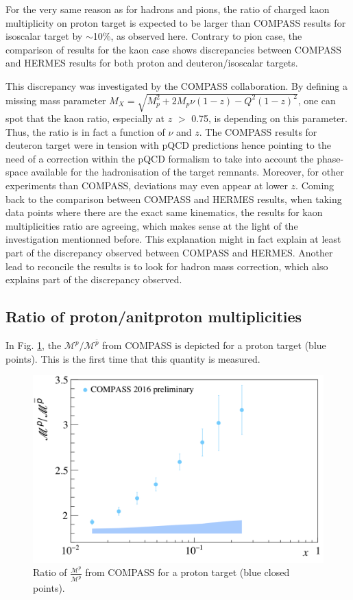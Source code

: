 For the very same reason as for hadrons and pions, the ratio of charged kaon multiplicity on proton target is expected to be larger than COMPASS results for isoscalar target by $\sim$10\%, as observed here. Contrary to pion case, the comparison of results for the kaon case shows discrepancies between COMPASS and HERMES results for both proton and deuteron/isoscalar targets.

This discrepancy was investigated by the COMPASS collaboration\cite{MarcinPubli}. By defining a missing mass parameter $M_X = \sqrt{M^2_p + 2M_p \nu (1-z) - Q^2 (1-z)^2}$, one can spot that the kaon ratio, especially at $z$ $>$ 0.75, is depending on this parameter. Thus, the ratio is in fact a function of $\nu$ and $z$. The COMPASS results for deuteron target were in tension with pQCD predictions hence pointing to the need of a correction within the pQCD formalism to take into account the phase-space available for the hadronisation of the target remnants. Moreover, for other experiments than COMPASS, deviations may even appear at lower $z$. Coming back to the comparison between COMPASS and HERMES results, when taking data points where there are the exact same kinematics, the results for kaon multiplicities ratio are agreeing, which makes sense at the light of the investigation mentionned before. This explanation might in fact explain at least part of the discrepancy observed between COMPASS and HERMES. Another lead to reconcile the results is to look for hadron mass correction\cite{Accardi}, which also explains part of the discrepancy observed.

\subsection{Ratio of proton/anitproton multiplicities}

In Fig. \ref{pic:pratio}, the $\mathscr{M}^{p}/\mathscr{M}^{\bar{p}}$ from COMPASS is depicted for a proton target (blue points). This is the first time that this quantity is measured.

\begin{figure}[!h]
  \centering
	\includegraphics[scale=0.5]{./gfx/pr.png}
	\caption{Ratio of $\frac{\mathscr{M}^{p}}{\mathscr{M}^{\overline{p}}}$ from COMPASS for a proton target (blue closed points).}
	\label{pic:pratio}
\end{figure}

